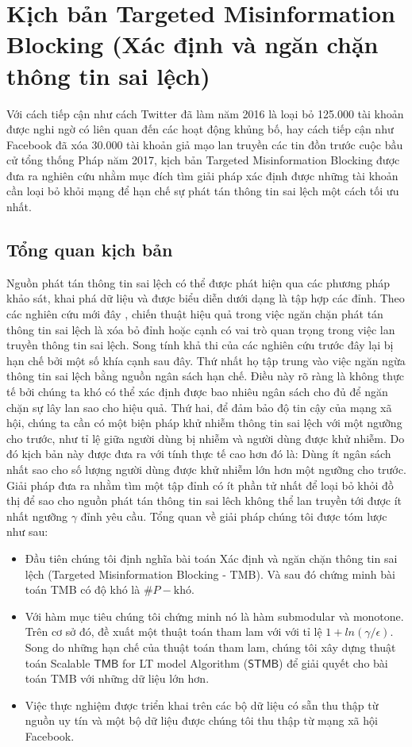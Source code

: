 \section{Kịch bản Targeted Misinformation Blocking (Xác định và ngăn chặn thông tin sai lệch)}

Với cách tiếp cận như cách Twitter đã làm năm 2016 là loại bỏ 125.000 tài khoản được nghi ngờ có liên quan đến các hoạt động khủng bố, hay cách tiếp cận như Facebook đã xóa 30.000 tài khoản giả mạo lan truyền các tin đồn trước cuộc bầu cử tổng thống Pháp năm 2017, kịch bản Targeted Misinformation Blocking được đưa ra nghiên cứu nhằm mục đích tìm giải pháp xác định được những tài khoản cần loại bỏ khỏi mạng để hạn chế sự phát tán thông tin sai lệch một cách tối ưu nhất.

\subsection{Tổng quan kịch bản}
Nguồn phát tán thông tin sai lệch có thể được phát hiện qua các phương pháp khảo sát, khai phá dữ liệu \cite{qazvin, kwon} và được biểu diễn dưới dạng là tập hợp các đỉnh. Theo các nghiên cứu mới đây \cite{khali, tong, pra}, chiến thuật hiệu quả trong việc ngăn chặn phát tán thông tin sai lệch là xóa bỏ đỉnh hoặc cạnh có vai trò quan trọng trong việc lan truyền thông tin sai lệch. Song tính khả thi của các nghiên cứu trước đây lại bị hạn chế bởi một số khía cạnh sau đây. Thứ nhất họ tập trung vào việc ngăn ngừa thông tin sai lệch bằng nguồn ngân sách hạn chế. Điều này rõ ràng là không thực tế bởi chúng ta khó có thể xác định được bao nhiêu ngân sách cho đủ để ngăn chặn sự lây lan sao cho hiệu quả. Thứ hai, để đảm bảo độ tin cậy của mạng xã hội, chúng ta cần có một biện pháp khử nhiễm thông tin sai lệch với một ngưỡng cho trước, như tỉ lệ giữa người dùng bị nhiễm và người dùng được khử nhiễm. Do đó kịch bản này được đưa ra với tính thực tế cao hơn đó là: Dùng ít ngân sách nhất sao cho số lượng người dùng được khử nhiễm lớn hơn một ngưỡng cho trước. Giải pháp đưa ra nhằm tìm một tập đỉnh có ít phần tử nhất để loại bỏ khỏi đồ thị để sao cho nguồn phát tán thông tin sai lêch không thể lan truyền tới được ít nhất ngưỡng $\gamma$ đỉnh yêu cầu. Tổng quan về giải pháp chúng tôi được tóm lược như sau:
\begin{itemize}
	\item Đầu tiên chúng tôi định nghĩa bài toán Xác định và ngăn chặn thông tin sai lệch (Targeted Misinformation Blocking - TMB). Và sau đó chứng minh bài toán TMB có độ khó là $\#P-\text{khó}$.
	\item Với hàm mục tiêu chúng tôi chứng minh nó là hàm submodular và monotone. Trên cơ sở đó, đề xuất một thuật toán tham lam với với tỉ lệ $1+ln(\gamma/\epsilon)$. Song do những hạn chế của thuật toán tham lam, chúng tôi xây dựng thuật toán Scalable $\mathsf{TMB}$ for LT model Algorithm ($\mathsf{STMB}$) để giải quyết cho bài toán TMB với những dữ liệu lớn hơn. 
	\item Việc thực nghiệm được triển khai trên các bộ dữ liệu có sẵn thu thập từ nguồn uy tín và một bộ dữ liệu được chúng tôi thu thập từ mạng xã hội Facebook. 
\end{itemize}

